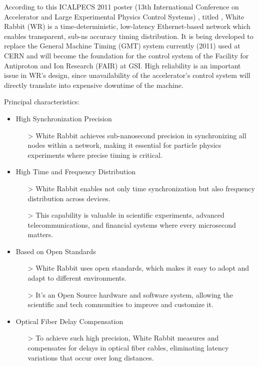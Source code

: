 \vspace{5 mm}

\noindent According to this ICALPECS 2011 poster (13th International Conference on Accelerator and Large Experimental Physics Control Systems) \cite{white-rabbit:poster}, titled , White Rabbit (WR) is a time-deterministic, low-latency Ethernet-based network which enables transparent, sub-ns accuracy timing distribution. 
It is being developed to replace the General Machine Timing (GMT) system currently (2011) used at CERN and will become the foundation for the control system of the Facility for Antiproton and Ion Research (FAIR) at GSI.
High reliability is an important issue in WR’s design, since unavailability of the accelerator’s control system will directly translate into expensive downtime of the machine.

\vspace{5 mm}

\noindent Principal characteristics:

\begin{itemize}
\item High Synchronization Precision
    \begin{itemize}
    \item[>] White Rabbit achieves sub-nanosecond precision in synchronizing all nodes within a network, making it essential for particle physics experiments where precise timing is critical.
    \end{itemize}
\item High Time and Frequency Distribution
    \begin{itemize}
    \item[>] White Rabbit enables not only time synchronization but also frequency distribution across devices.
    \item[>] This capability is valuable in scientific experiments, advanced telecommunications, and financial systems where every microsecond matters.
    \end{itemize}
\item Based on Open Standards
    \begin{itemize}
    \item[>] White Rabbit uses open standards, which makes it easy to adopt and adapt to different environments. 
    \item[>] It’s an Open Source hardware and software system, allowing the scientific and tech communities to improve and customize it.
    \end{itemize}
\item Optical Fiber Delay Compensation
    \begin{itemize}
    \item[>] To achieve such high precision, White Rabbit measures and compensates for delays in optical fiber cables, eliminating latency variations that occur over long distances.
    \end{itemize}
\end{itemize}

